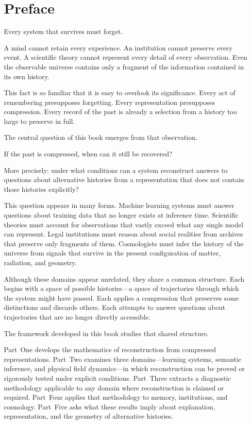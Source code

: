 \chapter*{Preface}

Every system that survives must forget.

A mind cannot retain every experience. An institution cannot preserve every event. A scientific theory cannot represent every detail of every observation. Even the observable universe contains only a fragment of the information contained in its own history.

This fact is so familiar that it is easy to overlook its significance. Every act of remembering presupposes forgetting. Every representation presupposes compression. Every record of the past is already a selection from a history too large to preserve in full.

The central question of this book emerges from that observation.

If the past is compressed, when can it still be recovered?

More precisely: under what conditions can a system reconstruct answers to questions about alternative histories from a representation that does not contain those histories explicitly?

This question appears in many forms. Machine learning systems must answer questions about training data that no longer exists at inference time. Scientific theories must account for observations that vastly exceed what any single model can represent. Legal institutions must reason about social realities from archives that preserve only fragments of them. Cosmologists must infer the history of the universe from signals that survive in the present configuration of matter, radiation, and geometry.

Although these domains appear unrelated, they share a common structure. Each begins with a space of possible histories---a space of trajectories through which the system might have passed. Each applies a compression that preserves some distinctions and discards others. Each attempts to answer questions about trajectories that are no longer directly accessible.

The framework developed in this book studies that shared structure.

Part~One develops the mathematics of reconstruction from compressed representations. Part~Two examines three domains---learning systems, semantic inference, and physical field dynamics---in which reconstruction can be proved or rigorously tested under explicit conditions. Part~Three extracts a diagnostic methodology applicable to any domain where reconstruction is claimed or required. Part~Four applies that methodology to memory, institutions, and cosmology. Part~Five asks what these results imply about explanation, representation, and the geometry of alternative histories.

